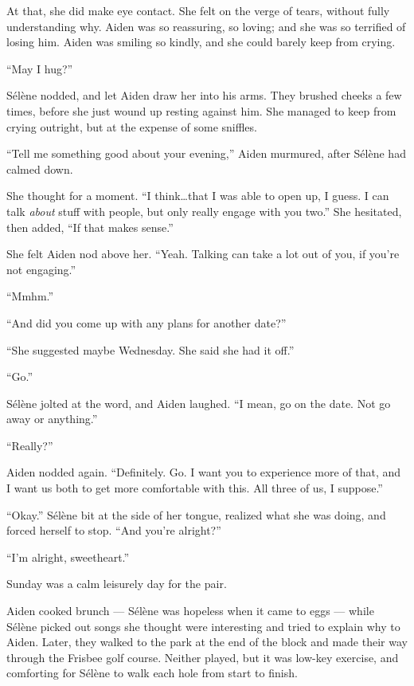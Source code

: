 At that, she did make eye contact. She felt on the verge of tears, without fully understanding why. Aiden was so reassuring, so loving; and she was so terrified of losing him. Aiden was smiling so kindly, and she could barely keep from crying.

``May I hug?''

Sélène nodded, and let Aiden draw her into his arms. They brushed cheeks a few times, before she just wound up resting against him. She managed to keep from crying outright, but at the expense of some sniffles.

``Tell me something good about your evening,'' Aiden murmured, after Sélène had calmed down.

She thought for a moment. ``I think\ldots{}that I was able to open up, I guess. I can talk \emph{about} stuff with people, but only really engage with you two.'' She hesitated, then added, ``If that makes sense.''

She felt Aiden nod above her. ``Yeah. Talking can take a lot out of you, if you're not engaging.''

``Mmhm.''

``And did you come up with any plans for another date?''

``She suggested maybe Wednesday. She said she had it off.''

``Go.''

Sélène jolted at the word, and Aiden laughed. ``I mean, go on the date. Not go away or anything.''

``Really?''

Aiden nodded again. ``Definitely. Go. I want you to experience more of that, and I want us both to get more comfortable with this. All three of us, I suppose.''

``Okay.'' Sélène bit at the side of her tongue, realized what she was doing, and forced herself to stop. ``And you're alright?''

``I'm alright, sweetheart.''

\secdiv{}

\noindent Sunday was a calm leisurely day for the pair.

Aiden cooked brunch --- Sélène was hopeless when it came to eggs --- while Sélène picked out songs she thought were interesting and tried to explain why to Aiden. Later, they walked to the park at the end of the block and made their way through the Frisbee golf course. Neither played, but it was low-key exercise, and comforting for Sélène to walk each hole from start to finish.


